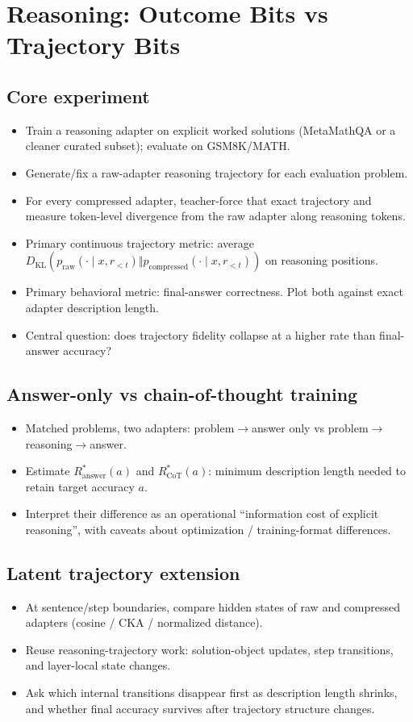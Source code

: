 \documentclass[10pt]{article}
\newcommand{\paperidea}[1]{\item #1}
\begin{document}
\section{Reasoning: Outcome Bits vs Trajectory Bits}
\subsection{Core experiment}
\begin{itemize}
  \paperidea{Train a reasoning adapter on explicit worked solutions (MetaMathQA or a cleaner curated subset); evaluate on GSM8K/MATH.}
  \paperidea{Generate/fix a raw-adapter reasoning trajectory for each evaluation problem.}
  \paperidea{For every compressed adapter, teacher-force that exact trajectory and measure token-level divergence from the raw adapter along reasoning tokens.}
  \paperidea{Primary continuous trajectory metric: average $D_{\mathrm{KL}}(p_{\mathrm{raw}}(\cdot\mid x,r_{<t})\Vert p_{\mathrm{compressed}}(\cdot\mid x,r_{<t}))$ on reasoning positions.}
  \paperidea{Primary behavioral metric: final-answer correctness. Plot both against exact adapter description length.}
  \paperidea{Central question: does trajectory fidelity collapse at a higher rate than final-answer accuracy?}
\end{itemize}

\subsection{Answer-only vs chain-of-thought training}
\begin{itemize}
  \paperidea{Matched problems, two adapters: problem$\rightarrow$answer only vs problem$\rightarrow$reasoning$\rightarrow$answer.}
  \paperidea{Estimate $R^*_{\mathrm{answer}}(a)$ and $R^*_{\mathrm{CoT}}(a)$: minimum description length needed to retain target accuracy $a$.}
  \paperidea{Interpret their difference as an operational ``information cost of explicit reasoning'', with caveats about optimization / training-format differences.}
\end{itemize}

\subsection{Latent trajectory extension}
\begin{itemize}
  \paperidea{At sentence/step boundaries, compare hidden states of raw and compressed adapters (cosine / CKA / normalized distance).}
  \paperidea{Reuse reasoning-trajectory work: solution-object updates, step transitions, and layer-local state changes.}
  \paperidea{Ask which internal transitions disappear first as description length shrinks, and whether final accuracy survives after trajectory structure changes.}
\end{itemize}
\end{document}
